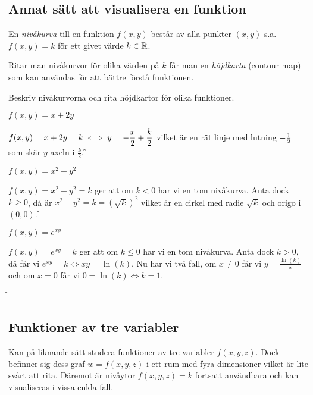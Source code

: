 \documentclass[a4paper]{article}
\begin{document}
\subsection{Annat sätt att visualisera en funktion}
\begin{defn}[Nivåkurva]
    En \emph{nivåkurva} till en funktion \(
        f(x,y)
    \) består av alla punkter \(
        (x,y)
    \) s.a.\ \(
        f(x,y) = k 
    \) för ett givet värde \(
        k \in \mathbb{R}
    \). 
\end{defn}

Ritar man nivåkurvor för olika värden på \(
    k
\) får man en \emph{höjdkarta} (contour map) som kan användas
för att bättre förstå funktionen.

Beskriv nivåkurvorna och rita höjdkartor för olika funktioner.
\begin{ex}
    \(
        f(x,y) = x+2y
    \) 

    \(
        f(x,y) = x+2y = k \iff y = -\displaystyle\frac{x}{2}  + \displaystyle\frac{k}{2} 
    \) vilket är en rät linje med lutning \(
        -\frac{1}{2}
    \)  som skär \(
        y
    \)-axeln i \(
        \frac{k}{2} 
    \).
    \f
\end{ex}
\begin{ex}
    \(
        f(x,y) = x^2+y^2
    \) 

    \(
        f(x,y) = x^2+y^2 = k 
    \) ger att om \(
        k < 0
    \) har vi en tom nivåkurva. Anta dock \(
        k \geq 0
    \), då är \(
        x^2+y^2 = k = \left(\sqrt{k}\right)^2
    \) vilket är en cirkel med radie \(
        \sqrt{k}
    \) och origo i \(
        (0,0)
    \).
    \f
\end{ex}
\begin{ex}
    \(
        f(x,y) = e^{xy}
    \) 

    \(
        f(x,y) = e^{xy} = k
    \) ger att om \(
        k \leq 0
    \) har vi en tom nivåkurva. Anta dock \(
        k > 0
    \), då får vi \(
        e^{xy} = k \iff
        xy = \ln(k) 
    \). Nu har vi två fall, 
    om \(
        x \neq 0 
    \) får vi \(
        y = \frac{\ln(k)}{x}
    \) och om \(
        x = 0 
    \) får vi \(
        0 = \ln(k) \iff k = 1
    \).

    \f
\end{ex}

\subsection{Funktioner av tre variabler}
Kan på liknande sätt studera funktioner av tre variabler \(
    f(x,y,z)
\). Dock befinner sig dess graf \(
    w = f(x,y,z)
\) i ett rum med fyra dimensioner vilket är lite svårt att rita.
Däremot är nivåytor \(
    f(x,y,z) = k
\) fortsatt användbara och kan visualiseras i vissa enkla fall.
\end{document}

